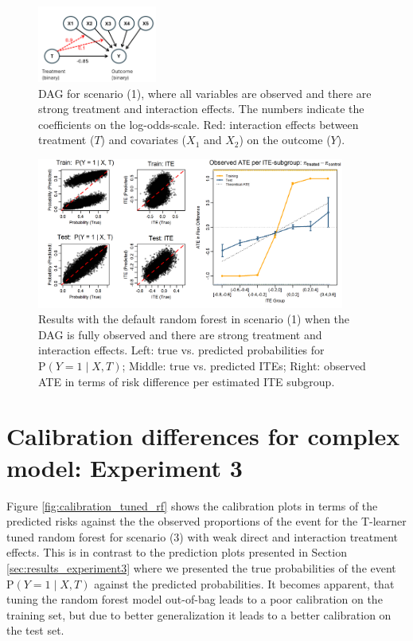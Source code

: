 \begin{figure}[htbp]
\centering
\includegraphics[width=0.35\textwidth]{img/results_ITE_simulation/simulation_observed.png}
\caption{DAG for scenario (1), where all variables are observed and there are strong treatment and interaction effects. The numbers indicate the coefficients on the log-odds-scale. Red: interaction effects between treatment ($T$) and covariates ($X_1$ and $X_2$) on the outcome ($Y$).}
\label{fig:fully_observed_dag_rf_appendix}
\end{figure}


\begin{figure}[htbp]
\centering
\includegraphics[width=0.9\textwidth]{img/results_ITE_simulation/fully_observed_rf_tlearner.png}
\caption{Results with the default random forest in scenario (1) when the DAG is fully observed and there are strong treatment and interaction effects. Left: true vs. predicted probabilities for $\text{P}(Y=1 \mid X, T)$; Middle: true vs. predicted ITEs; Right: observed ATE in terms of risk difference per estimated ITE subgroup.}
\label{fig:fully_observed_glm_rf}
\end{figure}




\section{Calibration differences for complex model: Experiment 3} \label{sec:calibration_tuned_rf}

Figure \ref{fig:calibration_tuned_rf} shows the calibration plots in terms of the predicted risks against the the observed proportions of the event for the T-learner tuned random forest for scenario (3) with weak direct and interaction treatment effects. This is in contrast to the prediction plots presented in Section \ref{sec:results_experiment3} where we presented the true probabilities of the event $\text{P}(Y=1 \mid X, T)$ against the predicted probabilities. It becomes apparent, that tuning the random forest model out-of-bag leads to a poor calibration on the training set, but due to better generalization it leads to a better calibration on the test set.

